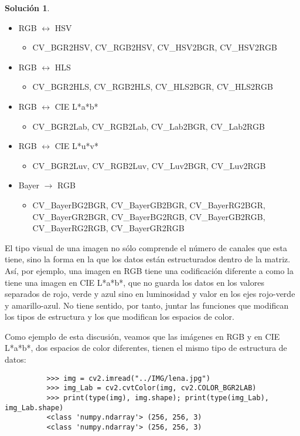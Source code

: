 \documentclass[a4paper, 11pt]{article}
\theoremstyle{definition}
\newtheorem*{solucion}{Solución}
\begin{document}
\begin{solucion}
\begin{itemize}
          \item RGB $\leftrightarrow$ HSV
              \begin{itemize}
                  \item CV\_BGR2HSV, CV\_RGB2HSV, CV\_HSV2BGR, CV\_HSV2RGB
              \end{itemize}

          \item RGB $\leftrightarrow$ HLS
              \begin{itemize}
                  \item CV\_BGR2HLS, CV\_RGB2HLS, CV\_HLS2BGR, CV\_HLS2RGB
              \end{itemize}

          \item RGB $\leftrightarrow$ CIE L*a*b*
              \begin{itemize}
                  \item CV\_BGR2Lab, CV\_RGB2Lab, CV\_Lab2BGR, CV\_Lab2RGB
              \end{itemize}

          \item RGB $\leftrightarrow$ CIE L*u*v*
              \begin{itemize}
                  \item CV\_BGR2Luv, CV\_RGB2Luv, CV\_Luv2BGR, CV\_Luv2RGB
              \end{itemize}

          \item Bayer $\rightarrow$ RGB
              \begin{itemize}
                  \item CV\_BayerBG2BGR, CV\_BayerGB2BGR, CV\_BayerRG2BGR, CV\_BayerGR2BGR, CV\_BayerBG2RGB, CV\_BayerGB2RGB, CV\_BayerRG2RGB, CV\_BayerGR2RGB
              \end{itemize}
      \end{itemize}

      El tipo visual de una imagen no sólo comprende el número de canales que esta tiene, sino la forma en la que los datos están estructurados dentro de la matriz. Así, por ejemplo, una imagen en RGB tiene una codificación diferente a como la tiene una imagen en CIE L*a*b*, que no guarda los datos en los valores separados de rojo, verde y azul sino en luminosidad y valor en los ejes rojo-verde y amarillo-azul. No tiene sentido, por tanto, juntar las funciones que modifican los tipos de estructura y los que modifican los espacios de color.

      Como ejemplo de esta discusión, veamos que las imágenes en RGB y en CIE L*a*b*, dos espacios de color diferentes, tienen el mismo tipo de estructura de datos:

      \begin{lstlisting}
          >>> img = cv2.imread("../IMG/lena.jpg")
          >>> img_Lab = cv2.cvtColor(img, cv2.COLOR_BGR2LAB)
          >>> print(type(img), img.shape); print(type(img_Lab), img_Lab.shape)
          <class 'numpy.ndarray'> (256, 256, 3)
          <class 'numpy.ndarray'> (256, 256, 3)
      \end{lstlisting}
  \end{solucion}
\end{document}
